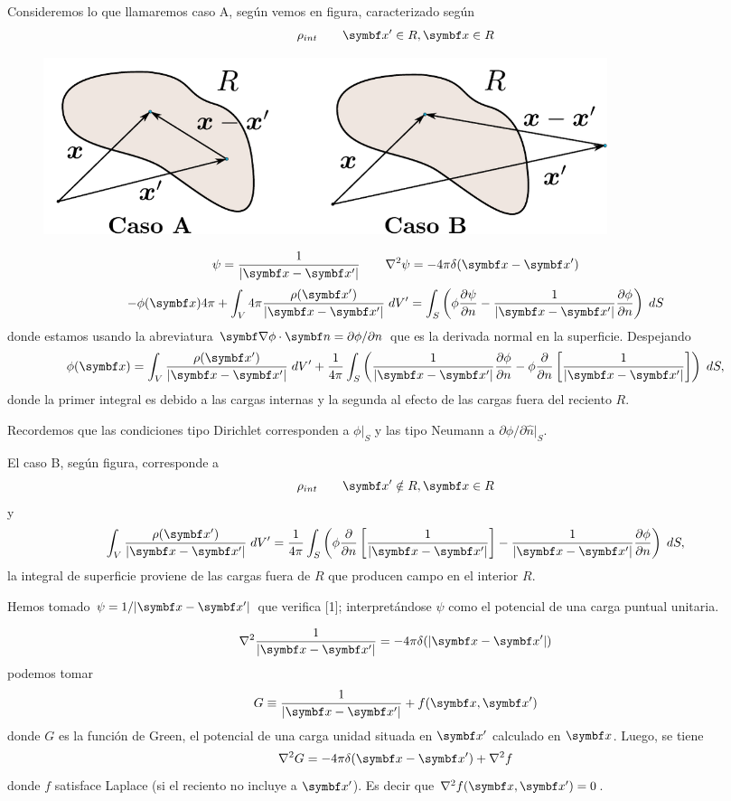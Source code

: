 \documentclass[10pt,oneside]{CBFT_book}
\begin{document}
Consideremos lo que llamaremos caso A, según vemos en figura, caracterizado según
\[
	\rho_{int} \qquad \vb{x}'\in R, \vb{x}\in R
\]
\begin{figure}[htb]
	\begin{center}
	\includegraphics[width=0.8\textwidth]{images/fig_ft1_imagegreenCasos.pdf}	 
	\end{center}
	\caption{}
\end{figure} 
\[
	\psi = \frac{1}{|\vb{x}-\vb{x}'|} \qquad \lapm{\psi} = -4\pi \delta(\vb{x}-\vb{x}')
\]
\[
	-\phi(\vb{x})4\pi + \int_V 4\pi \frac{\rho(\vb{x}')}{|\vb{x}-\vb{x}'|} \; dV' =
	\int_S \left( \phi\dpar{\psi}{n}-\frac{1}{|\vb{x}-\vb{x}'|}\dpar{\phi}{n}\right)\; dS 
\]
donde estamos usando la abreviatura $\Nabla\phi\cdot\vb{n}=\partial\phi/\partial n$ que es la
derivada normal en la superficie. Despejando
\[
	\phi(\vb{x}) = \int_V \frac{\rho(\vb{x}')}{|\vb{x}-\vb{x}'|} \; dV' +
	\frac{1}{4\pi} \int_S \left( \frac{1}{|\vb{x}-\vb{x}'|}\dpar{\phi}{n} -\phi\frac{\partial}{\partial 
n} \left[\frac{1}{|\vb{x}-\vb{x}'|} \right] \right)\; dS ,
\]
donde la primer integral es debido a las cargas internas y la segunda al efecto de las cargas
fuera del reciento $R$.

Recordemos que las condiciones tipo Dirichlet corresponden a $\phi|_S$ y las tipo Neumann a
$\partial\phi/\partial \hat{n}|_S$.

El caso B, según figura, corresponde a
\[
	\rho_{int} \qquad \vb{x}'\notin R, \vb{x}\in R
\]
y 
\[
	\int_V \frac{\rho(\vb{x}')}{|\vb{x}-\vb{x}'|} \; dV' = 
	\frac{1}{4\pi} \int_S \left( \phi\frac{\partial}{\partial n} \left[\frac{1}{|\vb{x}-\vb{x}'|} \right]
	- \frac{1}{|\vb{x}-\vb{x}'|}\dpar{\phi}{n}  \right)\; dS ,
\]
la integral de superficie proviene de las cargas fuera de $R$ que producen campo en el interior
$R$.

Hemos tomado $\psi=1/|\vb{x}-\vb{x}'|$ que verifica [1]; interpretándose $\psi$ como el potencial
de una carga puntual unitaria.

\[
	\lapm{\frac{1}{|\vb{x}-\vb{x}'|}} = - 4\pi \delta( |\vb{x}-\vb{x}'| )
\]
podemos tomar
\[
	G \equiv \frac{1}{|\vb{x}-\vb{x}'|} + f( \vb{x}, \vb{x}')
\]
donde $G$ es la función de Green, el potencial de una carga unidad situada en $\vbx'$ calculado
en $\vbx$.
Luego, se tiene
\[
	\lapm{G} = -4\pi  \delta( \vb{x} - \vb{x}' ) + \lapm{f}
\]
donde $f$ satisface Laplace (si el reciento no incluye a $\vb{x}'$). 
Es decir que $\lapm{f( \vbx, \vbx' )} = 0$.
\end{document}
